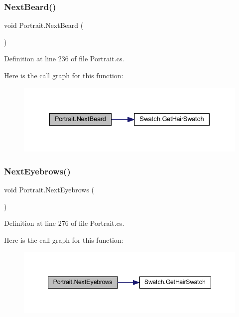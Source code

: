 \subsubsection{\texorpdfstring{NextBeard()}{NextBeard()}}
{\footnotesize\ttfamily void Portrait.\+Next\+Beard (\begin{DoxyParamCaption}{ }\end{DoxyParamCaption})}



Definition at line 236 of file Portrait.\+cs.

Here is the call graph for this function\+:
\nopagebreak
\begin{figure}[H]
\begin{center}
\leavevmode
\includegraphics[width=330pt]{class_portrait_a357f23630fd1689f2de8ef7a114c151e_cgraph}
\end{center}
\end{figure}
\mbox{\label{class_portrait_a6390e5c0ba5e52e4913703caf40682cd}} 
\subsubsection{\texorpdfstring{NextEyebrows()}{NextEyebrows()}}
{\footnotesize\ttfamily void Portrait.\+Next\+Eyebrows (\begin{DoxyParamCaption}{ }\end{DoxyParamCaption})}



Definition at line 276 of file Portrait.\+cs.

Here is the call graph for this function\+:
\nopagebreak
\begin{figure}[H]
\begin{center}
\leavevmode
\includegraphics[width=347pt]{class_portrait_a6390e5c0ba5e52e4913703caf40682cd_cgraph}
\end{center}
\end{figure}
\mbox{\label{class_portrait_aaa0da57aae916077e97d6c9d0a48aa4d}} 
